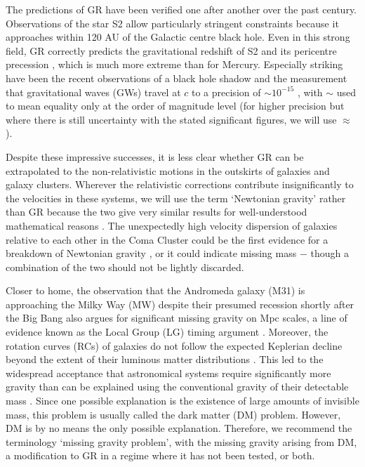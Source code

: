 \documentclass[fleqn,usenatbib,useAMS]{mnras} %
\begin{document}
The predictions of GR have been verified one after another over the past century. Observations of the star S2 allow particularly stringent constraints because it approaches within 120 AU of the Galactic centre black hole. Even in this strong field, GR correctly predicts the gravitational redshift of S2 \citep{Gravity_2018} and its pericentre precession \citep{Gravity_2020}, which is much more extreme than for Mercury. Especially striking have been the recent observations of a black hole shadow \citep{Event_Horizon_Telescope_2019} and the measurement that gravitational waves (GWs) travel at $c$ to a precision of $\sim 10^{-15}$ \citep{LIGO_Virgo_2017}, with $\sim$ used to mean equality only at the order of magnitude level (for higher precision but where there is still uncertainty with the stated significant figures, we will use $\approx$).

Despite these impressive successes, it is less clear whether GR can be extrapolated to the non-relativistic motions in the outskirts of galaxies and galaxy clusters. Wherever the relativistic corrections contribute insignificantly to the velocities in these systems, we will use the term `Newtonian gravity' rather than GR because the two give very similar results for well-understood mathematical reasons \citep{Rowland_2015, Almeida_2016}. The unexpectedly high velocity dispersion of galaxies relative to each other in the Coma Cluster could be the first evidence for a breakdown of Newtonian gravity \citep[and thus GR;][]{Zwicky_1933, Zwicky_1937}, or it could indicate missing mass $-$ though a combination of the two should not be lightly discarded.

Closer to home, the observation that the Andromeda galaxy (M31) is approaching the Milky Way (MW) despite their presumed recession shortly after the Big Bang also argues for significant missing gravity on Mpc scales, a line of evidence known as the Local Group (LG) timing argument \citep{Kahn_Woltjer_1959}. Moreover, the rotation curves (RCs) of galaxies do not follow the expected Keplerian decline beyond the extent of their luminous matter distributions \citep[][and references therein]{Faber_1979}. This led to the widespread acceptance that astronomical systems require significantly more gravity than can be explained using the conventional gravity of their detectable mass \citep[for a historical review, see][]{Sanders_2010}. Since one possible explanation is the existence of large amounts of invisible mass, this problem is usually called the dark matter (DM) problem. However, DM is by no means the only possible explanation. Therefore, we recommend the terminology `missing gravity problem', with the missing gravity arising from DM, a modification to GR in a regime where it has not been tested, or both.
\end{document}

